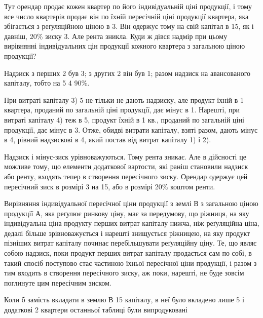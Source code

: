 \noindent{}Тут орендар продає кожен квартер по його індивідуальній ціні продукції,
і тому все число квартерів продає він по їхній пересічній ціні продукції квартера,
яка збігається з реґуляційною ціною в 3. Він одержує тому на свій
капітал в 15, як і давніш, 20\% зиску \deq{} 3. Але рента зникла.
Куди ж дівся надмір при цьому вирівнянні індивідуальних цін продукції кожного
квартера з загальною ціною продукції?

Надзиск з перших 2 був 3; з других 2
він був 1; разом надзиск на   авансованого капіталу, тобто на
5 \deq{} 4 \deq{} 90\%.

При витраті капіталу 3) 5 не тільки не дають надзиску, але
продукт їхній в 1 квартера, проданий по загальній ціні продукції, дає мінус в
1. Нарешті, при витраті капіталу 4) теж в 5, продукт
їхній в 1 кв., проданий по загальній ціні продукції, дає мінус в 3. Отже,
обидві витрати капіталу, взяті разом, дають мінус в 4, рівний надзискові
в 4, який постав від витрат капіталу 1) і 2).

Надзиск і мінус-зиск урівноважуються. Тому рента зникає. Але в дійсності
це можливе тому, що елементи додаткової вартости, які раніш становили
надзиск або ренту, входять тепер в створення пересічного зиску. Орендар одержує
цей пересічний зиск в розмірі 3 на 15, або в розмірі
20\% коштом ренти.

Вирівняння індивідуальної пересічної ціни продукції з землі $В$ з загальною
ціною продукції $А$, яка реґулює ринкову ціну, має за передумову, що ріжниця,
на яку індивідуальна ціна продукту перших витрат капіталу нижча,
ніж реґуляційна ціна, дедалі більше зрівноважується і нарешті знищується
ріжницею, на яку продукт пізніших витрат капіталу починає перебільшувати
реґуляційну ціну. Те, що являє собою надзиск, поки продукт перших витрат
капіталу продається сам по собі, в такий спосіб поступово стає частиною їхньої
пересічної ціни продукції, і разом з тим входить в створення пересічного зиску,
аж поки, нарешті, не буде зовсім поглинуте цим пересічним зиском.

Коли б замість вкладати в землю $В$ 15 капіталу, в неї було вкладено
лише 5 і додаткові 2 квартери останньої таблиці були випродуковані
\parbreak{}  %
